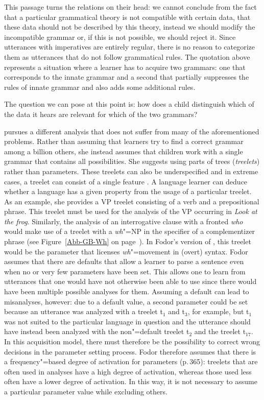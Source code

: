 This passage turns the relations on their head: we cannot conclude from the fact that a particular grammatical
theory is not compatible with certain data, 
that these data should not be described by this theory, instead we should modify the incompatible
grammar or, if this is not possible, we should reject it.
Since utterances with imperatives are entirely regular, there is no reason to categorize them as utterances that
do not follow grammatical rules. The quotation above represents a situation where a learner has to acquire two
grammars: one that corresponds to the innate grammar and a second that partially suppresses the rules of innate grammar
and also adds some additional rules.

The question we can pose at this point is: how does a child distinguish which of the data it hears are relevant for which of the two grammars?

\citet[]{Fodor98a} pursues a different analysis that does not suffer from many of the aforementioned problems.
 Rather than assuming that learners try to find a correct grammar among a billion others, she instead assumes that
 children work with a single grammar that contains all possibilities.
She suggests using parts of trees (\emph{treelets}) rather than parameters. These treelets can also be underspecified and
in extreme cases, a treelet can consist of a single feature \citep[]{Fodor98b}.
A language learner can deduce whether a language has a given property from the usage of a particular treelet.
As an example, she provides a VP treelet consisting of a verb and a prepositional phrase. 
This treelet must be used for the analysis of the VP occurring in \emph{Look at the
  frog}. Similarly, the analysis of an interrogative clause with a fronted \emph{who} would make use
of a treelet with a \emph{wh}"=NP in the specifier of a complementizer phrase (see Figure~\ref{Abb-GB-Wh} on page~\pageref{Abb-GB-Wh}).
In Fodor's version of \ppt, this treelet would be the parameter that licenses \emph{wh}"=movement in (overt) syntax.
Fodor assumes that there are defaults that allow a learner to parse a sentence even when no or very few
parameters have been set. This allows one to learn from utterances that one would have not otherwise been able to use since there would have
been multiple possible analyses for them. Assuming a default can lead to misanalyses, however: due to a default value, a second
parameter could be set because an utterance was analyzed with a treelet t$_1$ and t$_3$, for example, but t$_1$ was not suited to the particular
language in question and the utterance should have instead been analyzed with the non"=default treelet t$_2$ and the treelet t$_{17}$.
In this acquisition model, there must therefore be the possibility to correct wrong decisions in the parameter setting process. 
Fodor therefore assumes that there is a frequency"=based degree of activation for parameters (p.\,365): treelets that are often
used in analyses have a high degree of activation, whereas those used less often have a lower degree of activation.
In this way, it is not necessary to assume a particular parameter value while excluding others.


